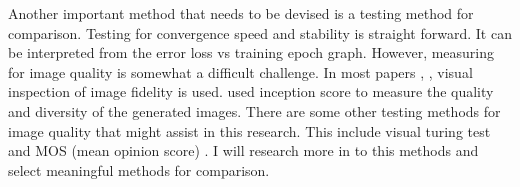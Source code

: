 \documentclass[../main/main.tex]{subfiles}
\begin{document}
	Another important method that needs to be devised is a testing method for comparison. Testing for convergence speed and stability is straight forward. It can be interpreted from the error loss vs training epoch graph. However, measuring for image quality is somewhat a difficult challenge. In most papers , ,  visual inspection of image fidelity is used.  used inception score to measure the quality and diversity of the generated images. There are some other testing methods for image quality that might assist in this research. This include visual turing test  and \gls{MOS} (mean opinion score) . I will research more in to this methods and select meaningful methods for comparison.
\end{document}
